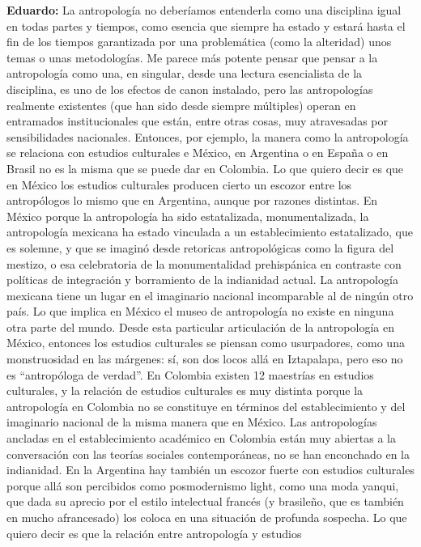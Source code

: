 \documentclass[
]{interact}
\begin{document}
\textbf{Eduardo:} La antropología no deberíamos entenderla como una
disciplina igual en todas partes y tiempos, como esencia que siempre ha
estado y estará hasta el fin de los tiempos garantizada por una
problemática (como la alteridad) unos temas o unas metodologías. Me
parece más potente pensar que pensar a la antropología como una, en
singular, desde una lectura esencialista de la disciplina, es uno de los
efectos de canon instalado, pero las antropologías realmente existentes
(que han sido desde siempre múltiples) operan en entramados
institucionales que están, entre otras cosas, muy atravesadas por
sensibilidades nacionales. Entonces, por ejemplo, la manera como la
antropología se relaciona con estudios culturales e México, en Argentina
o en España o en Brasil no es la misma que se puede dar en Colombia. Lo
que quiero decir es que en México los estudios culturales producen
cierto un escozor entre los antropólogos lo mismo que en Argentina,
aunque por razones distintas. En México porque la antropología ha sido
estatalizada, monumentalizada, la antropología mexicana ha estado
vinculada a un establecimiento estatalizado, que es solemne, y que se
imaginó desde retoricas antropológicas como la figura del mestizo, o esa
celebratoria de la monumentalidad prehispánica en contraste con
políticas de integración y borramiento de la indianidad actual. La
antropología mexicana tiene un lugar en el imaginario nacional
incomparable al de ningún otro país. Lo que implica en México el museo
de antropología no existe en ninguna otra parte del mundo. Desde esta
particular articulación de la antropología en México, entonces los
estudios culturales se piensan como usurpadores, como una monstruosidad
en las márgenes: sí, son dos locos allá en Iztapalapa, pero eso no es
``antropóloga de verdad''. En Colombia existen 12 maestrías en estudios
culturales, y la relación de estudios culturales es muy distinta porque
la antropología en Colombia no se constituye en términos del
establecimiento y del imaginario nacional de la misma manera que en
México. Las antropologías ancladas en el establecimiento académico en
Colombia están muy abiertas a la conversación con las teorías sociales
contemporáneas, no se han enconchado en la indianidad. En la Argentina
hay también un escozor fuerte con estudios culturales porque allá son
percibidos como posmodernismo light, como una moda yanqui, que dada su
aprecio por el estilo intelectual francés (y brasileño, que es también
en mucho afrancesado) los coloca en una situación de profunda sospecha.
Lo que quiero decir es que la relación entre antropología y estudios
\end{document}
